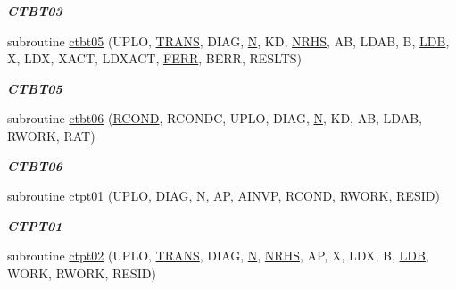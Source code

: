 \begin{DoxyCompactItemize}
\begin{DoxyCompactList}\small\item\em {\bfseries C\+T\+B\+T03} \end{DoxyCompactList}\item 
subroutine \hyperlink{group__complex__lin_ga2e4248f7d920feeecf4bc510bd6b56c6}{ctbt05} (U\+P\+L\+O, \hyperlink{superlu__enum__consts_8h_a0c4e17b2d5cea33f9991ccc6a6678d62a1f61e3015bfe0f0c2c3fda4c5a0cdf58}{T\+R\+A\+N\+S}, D\+I\+A\+G, \hyperlink{polmisc_8c_a0240ac851181b84ac374872dc5434ee4}{N}, K\+D, \hyperlink{example__user_8c_aa0138da002ce2a90360df2f521eb3198}{N\+R\+H\+S}, A\+B, L\+D\+A\+B, B, \hyperlink{example__user_8c_a50e90a7104df172b5a89a06c47fcca04}{L\+D\+B}, X, L\+D\+X, X\+A\+C\+T, L\+D\+X\+A\+C\+T, \hyperlink{superlu__enum__consts_8h_af00a42ecad444bbda75cde1b64bd7e72a78fd14d7abebae04095cfbe02928f153}{F\+E\+R\+R}, B\+E\+R\+R, R\+E\+S\+L\+T\+S)
\begin{DoxyCompactList}\small\item\em {\bfseries C\+T\+B\+T05} \end{DoxyCompactList}\item 
subroutine \hyperlink{group__complex__lin_ga2957ea45c268c9cf6b46c83aae91daf2}{ctbt06} (\hyperlink{superlu__enum__consts_8h_af00a42ecad444bbda75cde1b64bd7e72a9b5c151728d8512307565994c89919d5}{R\+C\+O\+N\+D}, R\+C\+O\+N\+D\+C, U\+P\+L\+O, D\+I\+A\+G, \hyperlink{polmisc_8c_a0240ac851181b84ac374872dc5434ee4}{N}, K\+D, A\+B, L\+D\+A\+B, R\+W\+O\+R\+K, R\+A\+T)
\begin{DoxyCompactList}\small\item\em {\bfseries C\+T\+B\+T06} \end{DoxyCompactList}\item 
subroutine \hyperlink{group__complex__lin_ga5f7567587c2c990494aa239fdeeb407f}{ctpt01} (U\+P\+L\+O, D\+I\+A\+G, \hyperlink{polmisc_8c_a0240ac851181b84ac374872dc5434ee4}{N}, A\+P, A\+I\+N\+V\+P, \hyperlink{superlu__enum__consts_8h_af00a42ecad444bbda75cde1b64bd7e72a9b5c151728d8512307565994c89919d5}{R\+C\+O\+N\+D}, R\+W\+O\+R\+K, R\+E\+S\+I\+D)
\begin{DoxyCompactList}\small\item\em {\bfseries C\+T\+P\+T01} \end{DoxyCompactList}\item 
subroutine \hyperlink{group__complex__lin_gabe6f6b9b59de629df0c4767e2c5499f8}{ctpt02} (U\+P\+L\+O, \hyperlink{superlu__enum__consts_8h_a0c4e17b2d5cea33f9991ccc6a6678d62a1f61e3015bfe0f0c2c3fda4c5a0cdf58}{T\+R\+A\+N\+S}, D\+I\+A\+G, \hyperlink{polmisc_8c_a0240ac851181b84ac374872dc5434ee4}{N}, \hyperlink{example__user_8c_aa0138da002ce2a90360df2f521eb3198}{N\+R\+H\+S}, A\+P, X, L\+D\+X, B, \hyperlink{example__user_8c_a50e90a7104df172b5a89a06c47fcca04}{L\+D\+B}, W\+O\+R\+K, R\+W\+O\+R\+K, R\+E\+S\+I\+D)

\end{DoxyCompactItemize}
